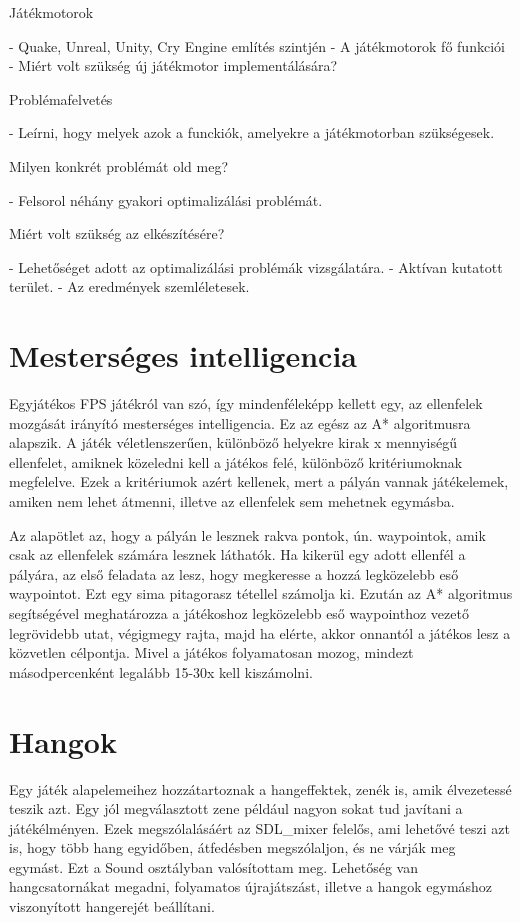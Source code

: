 \label{Chap:problemakor}

Játékmotorok

- Quake, Unreal, Unity, Cry Engine említés szintjén
- A játékmotorok fő funkciói
- Miért volt szükség új játékmotor implementálására?

Problémafelvetés

- Leírni, hogy melyek azok a funckiók, amelyekre a játékmotorban szükségesek.

Milyen konkrét problémát old meg?

- Felsorol néhány gyakori optimalizálási problémát.

Miért volt szükség az elkészítésére?

- Lehetőséget adott az optimalizálási problémák vizsgálatára.
- Aktívan kutatott terület.
- Az eredmények szemléletesek.

\section{Mesterséges intelligencia}

Egyjátékos FPS játékról van szó, így mindenféleképp kellett egy, az ellenfelek mozgását irányító mesterséges intelligencia. Ez az egész az A* algoritmusra alapszik. A játék véletlenszerűen, különböző helyekre kirak x mennyiségű ellenfelet, amiknek közeledni kell a játékos felé, különböző kritériumoknak megfelelve. Ezek a kritériumok azért kellenek, mert a pályán vannak játékelemek, amiken nem lehet átmenni, illetve az ellenfelek sem mehetnek egymásba. 

Az alapötlet az, hogy a pályán le lesznek rakva pontok, ún. waypointok, amik csak az ellenfelek számára lesznek láthatók. Ha kikerül egy adott ellenfél a pályára, az első feladata az lesz, hogy megkeresse a hozzá legközelebb eső waypointot. Ezt egy sima pitagorasz tétellel számolja ki. Ezután az A* algoritmus segítségével meghatározza a játékoshoz legközelebb eső waypointhoz vezető legrövidebb utat, végigmegy rajta, majd ha elérte, akkor onnantól a játékos lesz a közvetlen célpontja. Mivel a játékos folyamatosan mozog, mindezt másodpercenként legalább 15-30x kell kiszámolni.

\section{Hangok}

Egy játék alapelemeihez hozzátartoznak a hangeffektek, zenék is, amik élvezetessé teszik azt. Egy jól megválasztott zene például nagyon sokat tud javítani a játékélményen. Ezek megszólalásáért az SDL\_mixer felelős, ami lehetővé teszi azt is, hogy több hang egyidőben, átfedésben megszólaljon, és ne várják meg egymást. Ezt a Sound osztályban valósítottam meg. Lehetőség van hangcsatornákat megadni, folyamatos újrajátszást, illetve a hangok egymáshoz viszonyított hangerejét beállítani.

